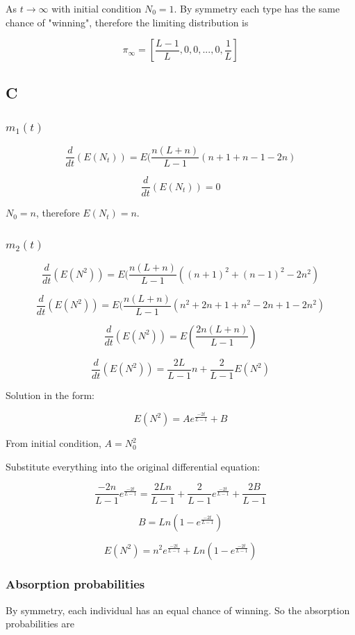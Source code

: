\documentclass{article}
\begin{document}
As $t \to \infty$ with initial condition $N_0 = 1$. By symmetry each type has the same chance of "winning", therefore the limiting distribution is

$$ \pi_{\infty} = [\frac{L-1}{L},0,0,...,0,\frac{1}{L}]$$

\subsection{C}

\subsubsection{$m_1(t)$}

$$\frac{d}{dt}(E(N_t)) = E(\frac{n(L+n)}{L-1}(n + 1 + n - 1 -2n)$$

$$\frac{d}{dt}(E(N_t)) = 0$$

$N_0 = n$, therefore $E(N_t)=n$.

\subsubsection{$m_2(t)$}

$$\frac{d}{dt}(E(N^2)) = E(\frac{n(L+n)}{L-1}((n + 1)^2 + (n - 1)^2 -2n^2)$$

$$\frac{d}{dt}(E(N^2)) = E(\frac{n(L+n)}{L-1}(n^2 + 2n + 1 + n^2 - 2n + 1 -2n^2)$$

$$\frac{d}{dt}(E(N^2)) = E(\frac{2n(L+n)}{L-1})$$

$$\frac{d}{dt}(E(N^2)) = \frac{2L}{L-1}n + \frac{2}{L-1}E(N^2)$$

Solution in the form:

$$E(N^2) = Ae^{\frac{-2t}{L-1}} + B$$

From initial condition, $A=N_0^2$

Substitute everything into the original differential equation:

$$\frac{-2n}{L-1}e^{\frac{-2t}{L-1}} = \frac{2Ln}{L-1} + \frac{2}{L-1}e^{\frac{-2t}{L-1}} + \frac{2B}{L-1}$$

$$B = Ln(1-e^{\frac{-2t}{L-1}})$$

$$E(N^2) = n^2e^{\frac{-2t}{L-1}} + Ln(1-e^{\frac{-2t}{L-1}})$$



\subsubsection{Absorption probabilities}

By symmetry, each individual has an equal chance of winning. So the absorption probabilities are
\end{document}
